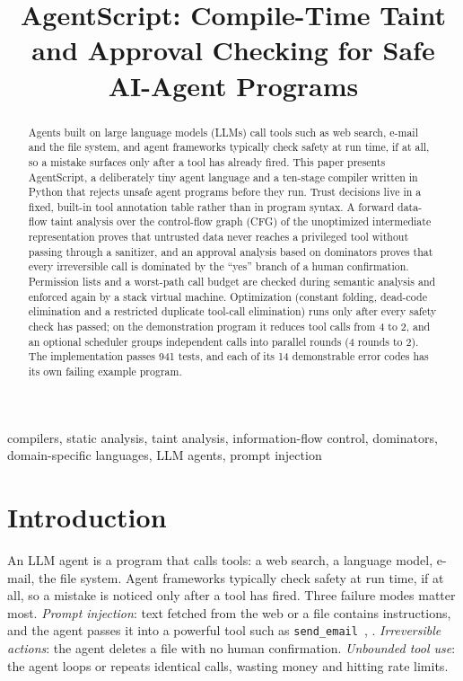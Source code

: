 \documentclass[conference]{IEEEtran}
\begin{document}
\title{AgentScript: Compile-Time Taint and Approval Checking for Safe AI-Agent Programs}
\author{
}
\maketitle

\begin{abstract}
Agents built on large language models (LLMs) call tools such as web search, e-mail and the file system, and agent frameworks typically check safety at run time, if at all, so a mistake surfaces only after a tool has already fired. This paper presents AgentScript, a deliberately tiny agent language and a ten-stage compiler written in Python that rejects unsafe agent programs before they run. Trust decisions live in a fixed, built-in tool annotation table rather than in program syntax. A forward data-flow taint analysis over the control-flow graph (CFG) of the unoptimized intermediate representation proves that untrusted data never reaches a privileged tool without passing through a sanitizer, and an approval analysis based on dominators proves that every irreversible call is dominated by the ``yes'' branch of a human confirmation. Permission lists and a worst-path call budget are checked during semantic analysis and enforced again by a stack virtual machine. Optimization (constant folding, dead-code elimination and a restricted duplicate tool-call elimination) runs only after every safety check has passed; on the demonstration program it reduces tool calls from 4 to 2, and an optional scheduler groups independent calls into parallel rounds (4 rounds to 2). The implementation passes 941 tests, and each of its 14 demonstrable error codes has its own failing example program.
\end{abstract}

\begin{IEEEkeywords}
compilers, static analysis, taint analysis, information-flow control, dominators, domain-specific languages, LLM agents, prompt injection
\end{IEEEkeywords}

\section{Introduction}
An LLM agent is a program that calls tools: a web search, a language model, e-mail, the file system. Agent frameworks typically check safety at run time, if at all, so a mistake is noticed only after a tool has fired. Three failure modes matter most. \emph{Prompt injection}: text fetched from the web or a file contains instructions, and the agent passes it into a powerful tool such as \texttt{send\_email}~\cite{greshake}, \cite{owasp}. \emph{Irreversible actions}: the agent deletes a file with no human confirmation. \emph{Unbounded tool use}: the agent loops or repeats identical calls, wasting money and hitting rate limits.
\end{document}
